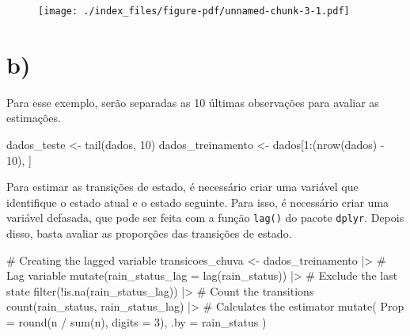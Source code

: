\documentclass[
  letterpaper,
  DIV=11,
  numbers=noendperiod]{scrreprt}
\newenvironment{Shaded}{\begin{snugshade}}{\end{snugshade}}
\newcommand{\AttributeTok}[1]{\textcolor[rgb]{0.40,0.45,0.13}{#1}}
\newcommand{\CommentTok}[1]{\textcolor[rgb]{0.37,0.37,0.37}{#1}}
\newcommand{\DecValTok}[1]{\textcolor[rgb]{0.68,0.00,0.00}{#1}}
\newcommand{\FunctionTok}[1]{\textcolor[rgb]{0.28,0.35,0.67}{#1}}
\newcommand{\NormalTok}[1]{\textcolor[rgb]{0.00,0.23,0.31}{#1}}
\newcommand{\OtherTok}[1]{\textcolor[rgb]{0.00,0.23,0.31}{#1}}
\newcommand{\SpecialCharTok}[1]{\textcolor[rgb]{0.37,0.37,0.37}{#1}}
\begin{document}
\begin{figure}[H]

{\centering \texttt{[image: ./index\_files/figure-pdf/unnamed-chunk-3-1.pdf]}

}

\end{figure}

\hypertarget{b}{%
\section*{b)}\label{b}}


Para esse exemplo, serão separadas as 10 últimas observações para
avaliar as estimações.

\begin{Shaded}
\begin{Highlighting}[]
\NormalTok{dados\_teste }\OtherTok{\textless{}{-}} \FunctionTok{tail}\NormalTok{(dados, }\DecValTok{10}\NormalTok{)}
\NormalTok{dados\_treinamento }\OtherTok{\textless{}{-}}\NormalTok{ dados[}\DecValTok{1}\SpecialCharTok{:}\NormalTok{(}\FunctionTok{nrow}\NormalTok{(dados) }\SpecialCharTok{{-}} \DecValTok{10}\NormalTok{), ]}
\end{Highlighting}
\end{Shaded}

Para estimar as transições de estado, é necessário criar uma variável
que identifique o estado atual e o estado seguinte. Para isso, é
necessário criar uma variável defasada, que pode ser feita com a função
\texttt{lag()} do pacote \texttt{dplyr}. Depois disso, basta avaliar as
proporções das transições de estado.

\begin{Shaded}
\begin{Highlighting}[]
\CommentTok{\# Creating the lagged variable}
\NormalTok{transicoes\_chuva }\OtherTok{\textless{}{-}}
\NormalTok{    dados\_treinamento }\SpecialCharTok{|\textgreater{}}
    \CommentTok{\# Lag variable}
    \FunctionTok{mutate}\NormalTok{(}\AttributeTok{rain\_status\_lag =} \FunctionTok{lag}\NormalTok{(rain\_status)) }\SpecialCharTok{|\textgreater{}}
    \CommentTok{\# Exclude the last state}
    \FunctionTok{filter}\NormalTok{(}\SpecialCharTok{!}\FunctionTok{is.na}\NormalTok{(rain\_status\_lag)) }\SpecialCharTok{|\textgreater{}}
    \CommentTok{\# Count the transitions}
    \FunctionTok{count}\NormalTok{(rain\_status, rain\_status\_lag) }\SpecialCharTok{|\textgreater{}}
    \CommentTok{\# Calculates the estimator}
    \FunctionTok{mutate}\NormalTok{(}
        \AttributeTok{Prop =} \FunctionTok{round}\NormalTok{(n }\SpecialCharTok{/} \FunctionTok{sum}\NormalTok{(n), }\AttributeTok{digits =} \DecValTok{3}\NormalTok{),}
        \AttributeTok{.by =}\NormalTok{ rain\_status}
\NormalTok{    )}
\end{Highlighting}
\end{Shaded}
\end{document}
